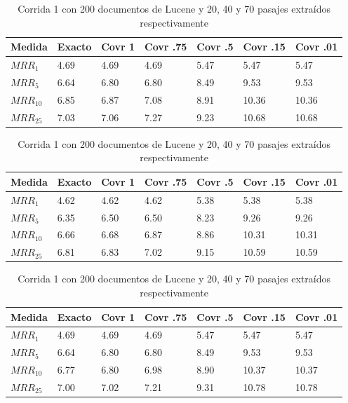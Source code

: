 \begin{table}[H]
\centering
\begin{center}
\begin{tabular}{|l | l | l | l | l | l | l |}
\hline
Medida & Exacto & Covr 1 & Covr .75 & Covr .5 & Covr .15 & Covr .01 \\ \hline
$MRR_{1}$ & 4.69 & 4.69 & 4.69 & 5.47 & 5.47 & 5.47  \\ \hline
$MRR_{5}$ & 6.64 & 6.80 & 6.80 & 8.49 & 9.53 & 9.53  \\ \hline
$MRR_{10}$ & 6.85 & 6.87 & 7.08 & 8.91 & 10.36 & 10.36  \\ \hline
$MRR_{25}$ & 7.03 & 7.06 & 7.27 & 9.23 & 10.68 & 10.68  \\ \hline
\end{tabular}

\medskip

\begin{tabular}{|l | l | l | l | l | l | l |}
\hline
Medida & Exacto & Covr 1 & Covr .75 & Covr .5 & Covr .15 & Covr .01 \\ \hline
$MRR_{1}$ & 4.62 & 4.62 & 4.62 & 5.38 & 5.38 & 5.38  \\ \hline
$MRR_{5}$ & 6.35 & 6.50 & 6.50 & 8.23 & 9.26 & 9.26  \\ \hline
$MRR_{10}$ & 6.66 & 6.68 & 6.87 & 8.86 & 10.31 & 10.31  \\ \hline
$MRR_{25}$ & 6.81 & 6.83 & 7.02 & 9.15 & 10.59 & 10.59  \\ \hline
\end{tabular}

\medskip

\begin{tabular}{|l | l | l | l | l | l | l |}
\hline
Medida & Exacto & Covr 1 & Covr .75 & Covr .5 & Covr .15 & Covr .01 \\ \hline
$MRR_{1}$ & 4.69 & 4.69 & 4.69 & 5.47 & 5.47 & 5.47  \\ \hline
$MRR_{5}$ & 6.64 & 6.80 & 6.80 & 8.49 & 9.53 & 9.53  \\ \hline
$MRR_{10}$ & 6.77 & 6.80 & 6.98 & 8.90 & 10.37 & 10.37  \\ \hline
$MRR_{25}$ & 7.00 & 7.02 & 7.21 & 9.31 & 10.78 & 10.78  \\ \hline
\end{tabular}
\caption{Corrida 1 con 200 documentos de Lucene y 20, 40 y 70 pasajes extraídos respectivamente}
\label{table:1_200_getExactMRRWikiFactoid_getCovrMRRWikiFactoid}
\end{center}
\end{table}

